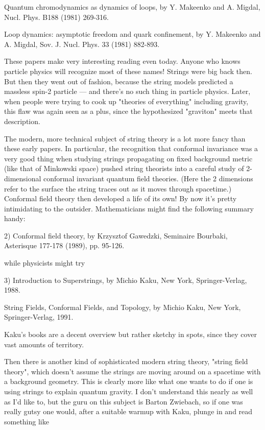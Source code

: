 Quantum chromodynamics as dynamics of loops, by Y. Makeenko and A.
Migdal, Nucl. Phys. B188 (1981) 269-316. 

Loop dynamics: asymptotic freedom and quark confinement, by Y. Makeenko
and A. Migdal, Sov. J. Nucl. Phys. 33 (1981) 882-893.

These papers make very interesting reading even today.  Anyone who knows
particle physics will recognize most of these names!  Strings were big
back then.  But then they went out of fashion, because the string models
predicted a massless spin-2 particle --- and there's no such thing in
particle physics.  Later, when people were trying to cook up "theories
of everything" including gravity, this flaw was again seen as a plus,
since the hypothesized "graviton" meets that description.

The modern, more technical subject of string theory is a lot more fancy
than these early papers.  In particular, the recognition that conformal
invariance was a very good thing when studying strings propagating on
fixed background metric (like that of Minkowski space) pushed string
theorists into a careful study of 2-dimensional conformal invariant
quantum field theories.  (Here the 2 dimensions refer to the surface the
string traces out as it moves through spacetime.)  Conformal field
theory then developed a life of its own!  By now it's pretty
intimidating to the outsider.  Mathematicians might find the following
summary handy:

2) Conformal field theory, by Krzysztof Gawedzki, Seminaire Bourbaki,
Asterisque 177-178 (1989), pp. 95-126.

while physicists might try 

3) Introduction to Superstrings, by Michio Kaku, New York, Springer-Verlag,
1988.

String Fields, Conformal Fields, and Topology, by Michio Kaku, New York,
Springer-Verlag, 1991.

Kaku's books are a decent overview but rather sketchy in spots, since
they cover vast amounts of territory.

Then there is another kind of sophisticated modern string theory,
"string field theory", which doesn't assume the strings are moving
around on a spacetime with a background geometry.   This is clearly more
like what one wants to do if one is using strings to explain quantum
gravity.  I don't understand this nearly as well as I'd like to, but the
guru on this subject is Barton Zwiebach, so if one was really gutsy one
would, after a suitable warmup with Kaku, plunge in and read something like

